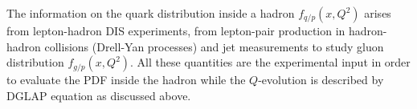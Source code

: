 The information on the quark distribution inside a hadron $f_{q/p}(x,Q^2)$ arises from lepton-hadron DIS experiments, from lepton-pair production in hadron-hadron collisions (Drell-Yan processes) and jet measurements to study gluon distribution $f_{g/p}(x,Q^2)$. All these quantities are the experimental input in order to evaluate the PDF inside the hadron while the $Q$-evolution is described by DGLAP equation as discussed above.




